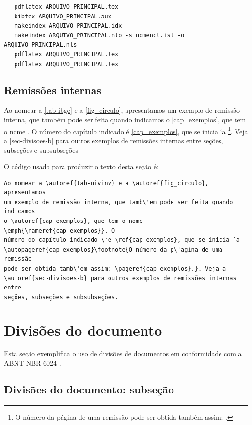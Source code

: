\begin{verbatim}
   pdflatex ARQUIVO_PRINCIPAL.tex
   bibtex ARQUIVO_PRINCIPAL.aux
   makeindex ARQUIVO_PRINCIPAL.idx 
   makeindex ARQUIVO_PRINCIPAL.nlo -s nomencl.ist -o ARQUIVO_PRINCIPAL.nls
   pdflatex ARQUIVO_PRINCIPAL.tex
   pdflatex ARQUIVO_PRINCIPAL.tex
\end{verbatim}

\subsection{Remissões internas}

Ao nomear a \autoref{tab-ibge} e a \autoref{fig_circulo}, apresentamos um exemplo de remissão interna, que tamb\'em pode ser feita quando indicamos o
\autoref{cap_exemplos}, que tem o nome \emph{}. O número
do capítulo indicado \'e \ref{cap_exemplos}, que se inicia `a
\footnote{O número da p\'agina de uma remissão pode ser
	obtida tamb\'em assim:
	\pageref{cap_exemplos}.}.
Veja a \autoref{sec-divisoes-b} para outros exemplos de remissões internas entre
seções, subseções e subsubseções.

O código usado para produzir o texto desta seção \'e:

\begin{verbatim}
Ao nomear a \autoref{tab-nivinv} e a \autoref{fig_circulo}, apresentamos 
um exemplo de remissão interna, que tamb\'em pode ser feita quando indicamos 
o \autoref{cap_exemplos}, que tem o nome \emph{\nameref{cap_exemplos}}. O
número do capítulo indicado \'e \ref{cap_exemplos}, que se inicia `a 
\autopageref{cap_exemplos}\footnote{O número da p\'agina de uma remissão 
pode ser obtida tamb\'em assim: \pageref{cap_exemplos}.}. Veja a 
\autoref{sec-divisoes-b} para outros exemplos de remissões internas entre 
seções, subseções e subsubseções.
\end{verbatim}

\section{Divisões do documento}\label{sec-divisoes-b}
Esta seção exemplifica o uso de divisões de documentos em conformidade com a ABNT NBR 6024  \cite{nbr6024}.
\subsection{Divisões do documento: subseção}\label{sec-divisoes-subsection}

